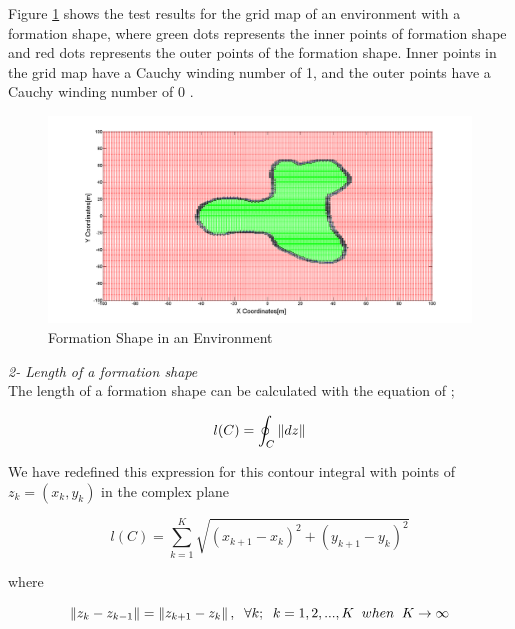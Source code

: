 Figure \ref{iceride_disarida_refe} shows the test results for the grid map of an environment with a formation shape, where green dots represents the inner points of formation shape and red dots represents the outer points of the formation shape. Inner points in the grid map have a Cauchy winding number of 1, and the outer points have a Cauchy winding number of 0 .

\begin{figure}[H]
\centering
\captionsetup{format=hang,justification=centerfirst}
\caption{Formation Shape in an Environment} \label{iceride_disarida_refe}
\includegraphics[scale = 0.28]{iceride_disarida}
\end{figure}

\textit{ 	2- Length of a formation shape} \\ 
The length of a formation shape can be calculated with the equation of \cite{17};
		
\begin{equation}
l(C)= \oint_C \left\lVert dz\right\rVert
\end{equation}
		
We have redefined this expression for this contour integral with points of   $z_k = (x_k,y_k)$ in the complex plane

\begin{equation}
l(C) = \sum_{k=1}^{K}\sqrt{(x_{k+1} - x_k)^2 + (y_{k+1} - y_k)^2}
\end{equation}

where

\begin{equation}
\left\lVert z_k - z_{k-1}\right\rVert = \left\lVert z_{k+1} - z_k\right\rVert, \hspace{0.2cm}  \forall k ;  \hspace{0.2cm} k=1,2,...,K \hspace{0.2cm} when  \hspace{0.2cm} K \to\infty
\end{equation}
		
